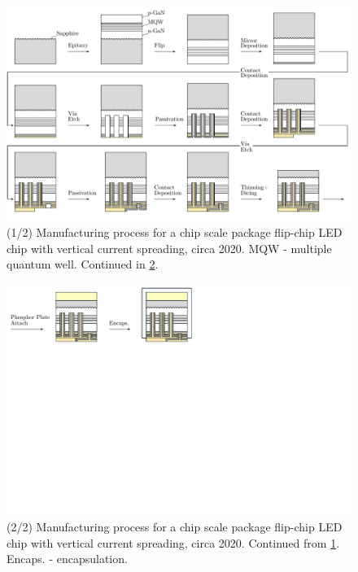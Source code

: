 \documentclass[parskip=full]{article}
\begin{document}

    \begin{landscape}
        \begin{figure}
            \includegraphics[width=595pt]{./figures/csp_overview_2020-1.pdf}
            \caption{(1/2) Manufacturing process for a chip scale package flip-chip LED chip with vertical current spreading, circa 2020. MQW - multiple quantum well. Continued in \cref{fig:manuf_csp_2020-2}.}
            \label{fig:manuf_csp_2020-1}
        \end{figure}
    \end{landscape}

    \begin{landscape}
        \begin{figure}
            \includegraphics[width=595pt]{./figures/csp_overview_2020-2.pdf}
            \caption{(2/2) Manufacturing process for a chip scale package flip-chip LED chip with vertical current spreading, circa 2020. Continued from \cref{fig:manuf_csp_2020-1}. Encaps. - encapsulation.}
            \label{fig:manuf_csp_2020-2}
        \end{figure}
    \end{landscape}
\end{document}
